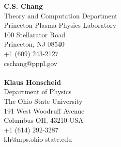 \documentclass[12pt,a4paper,sans]{moderncv}	%
\begin{document}
%
\begin{minipage}{0.48\textwidth}
\textbf{C.S. Chang} \\
Theory and Computation Department \\
Princeton Plasma Physics Laboratory \\
100 Stellarator Road \\
Princeton, NJ 08540 \\
+1 (609) 243-2127 \\
cschang@pppl.gov \\
\\
\textbf{Klaus Honscheid} \\
Department of Physics \\
The Ohio State University \\
191 West Woodruff Avenue \\
Columbus OH, 43210 USA \\
+1 (614) 292-3287 \\
kh@mps.ohio-state.edu \\
\end{minipage}



\end{document}

